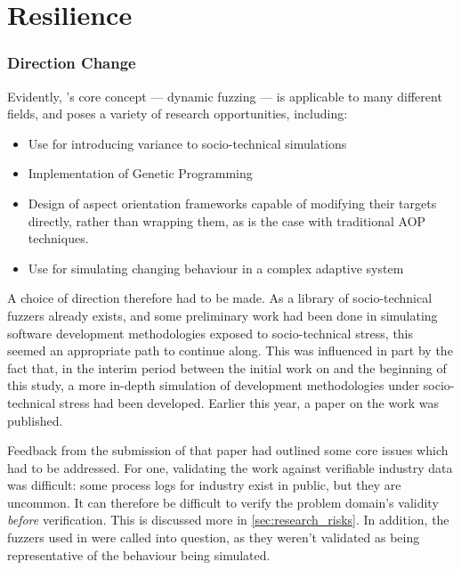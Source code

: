 \documentclass{article}
\begin{document}
\part{Resilience}
\label{part:resilience}
\section{Direction Change}
Evidently, \pdsf{}'s core concept --- dynamic fuzzing --- is applicable to many
different fields, and poses a variety of research opportunities, including:

\begin{itemize}
\item Use for introducing variance to socio-technical
  simulations\cite{honours_thesis}
\item Implementation of Genetic Programming\cite{realx_paper}
\item Design of aspect orientation frameworks capable of modifying their targets
  directly, rather than wrapping them, as is the case with traditional AOP
  techniques\cite{aspectj}.
\item Use for simulating changing behaviour in a complex adaptive system
\end{itemize}

A choice of direction therefore had to be made. As a library of socio-technical
fuzzers already exists\cite{fuzzi_moss_repo}, and some preliminary work had been
done in simulating software development methodologies exposed to socio-technical
stress, this seemed an appropriate path to continue along. This was influenced
in part by the fact that, in the interim period between the initial work on
\pdsf{}\cite{honours_thesis} and the beginning of this study, a more in-depth
simulation of development methodologies under socio-technical stress had been
developed. Earlier this year, a paper on the work was
published\cite{caise_forum_18}.\par

Feedback from the submission of that paper had outlined some core issues which
had to be addressed. For one, validating the work against verifiable industry
data was difficult: some process logs for industry exist in public, but they are
uncommon. It can therefore be difficult to verify the problem domain's validity
\emph{before} verification. This is discussed more in \cref{sec:research_risks}. In
addition, the fuzzers used in \cite{caise_forum_18} were called into question,
as they weren't validated as being representative of the behaviour being
simulated.\par
\end{document}
